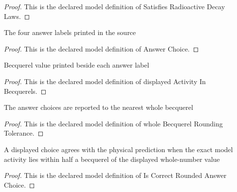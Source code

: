 \begin{proof}
  This is the declared model definition of Satisfies Radioactive Decay Laws.
\end{proof}
\begin{definition}
  \label{def:physics:phyx-mini-0576:phyxminiproblems-problemphyxmini0576-answerchoice}
  The four answer labels printed in the source
\end{definition}
\begin{proof}
  This is the declared model definition of Answer Choice.
\end{proof}
\begin{definition}
  \label{def:physics:phyx-mini-0576:phyxminiproblems-problemphyxmini0576-displayedactivityinbecquerels}
  Becquerel value printed beside each answer label
\end{definition}
\begin{proof}
  This is the declared model definition of displayed Activity In Becquerels.
\end{proof}
\begin{definition}
  \label{def:physics:phyx-mini-0576:phyxminiproblems-problemphyxmini0576-wholebecquerelroundingtolerance}
  The answer choices are reported to the nearest whole becquerel
\end{definition}
\begin{proof}
  This is the declared model definition of whole Becquerel Rounding Tolerance.
\end{proof}
\begin{definition}
  \label{def:physics:phyx-mini-0576:phyxminiproblems-problemphyxmini0576-iscorrectroundedanswerchoice}
  A displayed choice agrees with the physical prediction when the exact model activity lies within half a becquerel of the displayed whole-number value
\end{definition}
\begin{proof}
  This is the declared model definition of Is Correct Rounded Answer Choice.
\end{proof}
